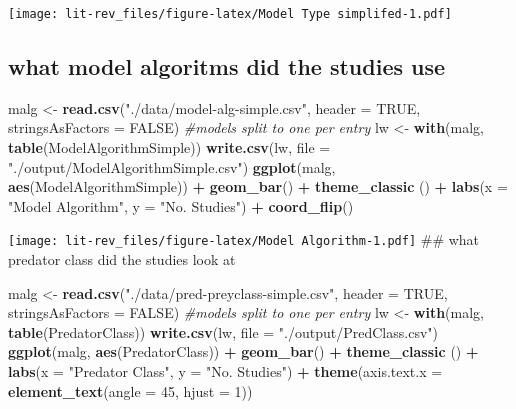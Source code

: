 \documentclass[
]{article}
\newenvironment{Shaded}{\begin{snugshade}}{\end{snugshade}}
\newcommand{\CommentTok}[1]{\textcolor[rgb]{0.56,0.35,0.01}{\textit{#1}}}
\newcommand{\DataTypeTok}[1]{\textcolor[rgb]{0.13,0.29,0.53}{#1}}
\newcommand{\DecValTok}[1]{\textcolor[rgb]{0.00,0.00,0.81}{#1}}
\newcommand{\KeywordTok}[1]{\textcolor[rgb]{0.13,0.29,0.53}{\textbf{#1}}}
\newcommand{\NormalTok}[1]{#1}
\newcommand{\OperatorTok}[1]{\textcolor[rgb]{0.81,0.36,0.00}{\textbf{#1}}}
\newcommand{\OtherTok}[1]{\textcolor[rgb]{0.56,0.35,0.01}{#1}}
\newcommand{\StringTok}[1]{\textcolor[rgb]{0.31,0.60,0.02}{#1}}
\begin{document}
\texttt{[image: lit-rev\_files/figure-latex/Model Type simplifed-1.pdf]}

\hypertarget{what-model-algoritms-did-the-studies-use}{%
\subsection{what model algoritms did the studies
use}\label{what-model-algoritms-did-the-studies-use}}

\begin{Shaded}
\begin{Highlighting}[]
\NormalTok{malg <-}\StringTok{ }\KeywordTok{read.csv}\NormalTok{(}\StringTok{"./data/model-alg-simple.csv"}\NormalTok{, }\DataTypeTok{header =} \OtherTok{TRUE}\NormalTok{, }\DataTypeTok{stringsAsFactors =} \OtherTok{FALSE}\NormalTok{) }\CommentTok{#models split to one per entry}
\NormalTok{lw <-}\StringTok{ }\KeywordTok{with}\NormalTok{(malg, }\KeywordTok{table}\NormalTok{(ModelAlgorithmSimple))}
\KeywordTok{write.csv}\NormalTok{(lw, }\DataTypeTok{file =} \StringTok{"./output/ModelAlgorithmSimple.csv"}\NormalTok{)}
\KeywordTok{ggplot}\NormalTok{(malg, }\KeywordTok{aes}\NormalTok{(ModelAlgorithmSimple)) }\OperatorTok{+}\StringTok{ }\KeywordTok{geom_bar}\NormalTok{() }\OperatorTok{+}\StringTok{ }\KeywordTok{theme_classic}\NormalTok{ () }\OperatorTok{+}\StringTok{ }\KeywordTok{labs}\NormalTok{(}\DataTypeTok{x =} \StringTok{"Model Algorithm"}\NormalTok{, }\DataTypeTok{y =} \StringTok{"No. Studies"}\NormalTok{) }\OperatorTok{+}\StringTok{ }\KeywordTok{coord_flip}\NormalTok{()}
\end{Highlighting}
\end{Shaded}

\texttt{[image: lit-rev\_files/figure-latex/Model Algorithm-1.pdf]} \#\#
what predator class did the studies look at

\begin{Shaded}
\begin{Highlighting}[]
\NormalTok{malg <-}\StringTok{ }\KeywordTok{read.csv}\NormalTok{(}\StringTok{"./data/pred-preyclass-simple.csv"}\NormalTok{, }\DataTypeTok{header =} \OtherTok{TRUE}\NormalTok{, }\DataTypeTok{stringsAsFactors =} \OtherTok{FALSE}\NormalTok{) }\CommentTok{#models split to one per entry}
\NormalTok{lw <-}\StringTok{ }\KeywordTok{with}\NormalTok{(malg, }\KeywordTok{table}\NormalTok{(PredatorClass))}
\KeywordTok{write.csv}\NormalTok{(lw, }\DataTypeTok{file =} \StringTok{"./output/PredClass.csv"}\NormalTok{)}
\KeywordTok{ggplot}\NormalTok{(malg, }\KeywordTok{aes}\NormalTok{(PredatorClass)) }\OperatorTok{+}\StringTok{ }\KeywordTok{geom_bar}\NormalTok{() }\OperatorTok{+}\StringTok{ }\KeywordTok{theme_classic}\NormalTok{ () }\OperatorTok{+}\StringTok{ }\KeywordTok{labs}\NormalTok{(}\DataTypeTok{x =} \StringTok{"Predator Class"}\NormalTok{, }\DataTypeTok{y =} \StringTok{"No. Studies"}\NormalTok{) }\OperatorTok{+}\StringTok{ }\KeywordTok{theme}\NormalTok{(}\DataTypeTok{axis.text.x =} \KeywordTok{element_text}\NormalTok{(}\DataTypeTok{angle =} \DecValTok{45}\NormalTok{, }\DataTypeTok{hjust =} \DecValTok{1}\NormalTok{))}
\end{Highlighting}
\end{Shaded}
\end{document}
